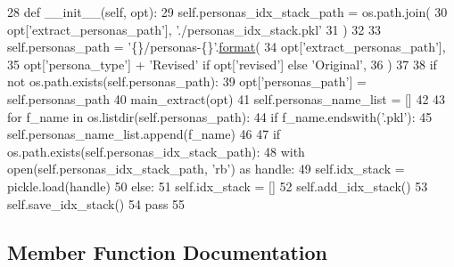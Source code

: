 \begin{DoxyCode}
28     \textcolor{keyword}{def }\_\_init\_\_(self, opt):
29         self.personas\_idx\_stack\_path = os.path.join(
30             opt[\textcolor{stringliteral}{'extract\_personas\_path'}], \textcolor{stringliteral}{'./personas\_idx\_stack.pkl'}
31         )
32 
33         self.personas\_path = \textcolor{stringliteral}{'\{\}/personas-\{\}'}.\hyperlink{namespaceparlai_1_1chat__service_1_1services_1_1messenger_1_1shared__utils_a32e2e2022b824fbaf80c747160b52a76}{format}(
34             opt[\textcolor{stringliteral}{'extract\_personas\_path'}],
35             opt[\textcolor{stringliteral}{'persona\_type'}] + \textcolor{stringliteral}{'Revised'} \textcolor{keywordflow}{if} opt[\textcolor{stringliteral}{'revised'}] \textcolor{keywordflow}{else} \textcolor{stringliteral}{'Original'},
36         )
37 
38         \textcolor{keywordflow}{if} \textcolor{keywordflow}{not} os.path.exists(self.personas\_path):
39             opt[\textcolor{stringliteral}{'personas\_path'}] = self.personas\_path
40             main\_extract(opt)
41         self.personas\_name\_list = []
42 
43         \textcolor{keywordflow}{for} f\_name \textcolor{keywordflow}{in} os.listdir(self.personas\_path):
44             \textcolor{keywordflow}{if} f\_name.endswith(\textcolor{stringliteral}{'.pkl'}):
45                 self.personas\_name\_list.append(f\_name)
46 
47         \textcolor{keywordflow}{if} os.path.exists(self.personas\_idx\_stack\_path):
48             with open(self.personas\_idx\_stack\_path, \textcolor{stringliteral}{'rb'}) \textcolor{keyword}{as} handle:
49                 self.idx\_stack = pickle.load(handle)
50         \textcolor{keywordflow}{else}:
51             self.idx\_stack = []
52             self.add\_idx\_stack()
53             self.save\_idx\_stack()
54         \textcolor{keywordflow}{pass}
55 
\end{DoxyCode}


\subsection{Member Function Documentation}
\mbox{\label{classparlai_1_1mturk_1_1tasks_1_1personachat_1_1personachat__chat_1_1worlds_1_1PersonasGenerator_a432b4b3a15961d806c89e1a9c840bd4b}} 
